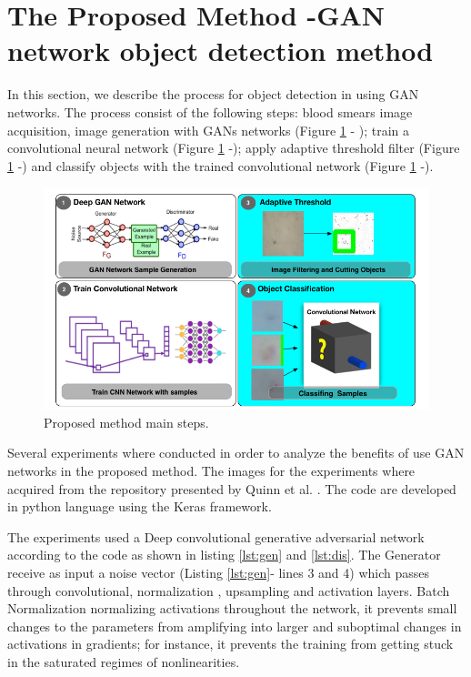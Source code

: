 \section{The Proposed Method -GAN network object detection method}
\label{segmethod}

In this section, we describe the process for object detection in using GAN networks. The process consist of the following steps: blood smears image acquisition, image generation with GANs networks (Figure \ref{fig:maincomp} - ); train a convolutional neural network (Figure \ref{fig:maincomp} -);  apply adaptive  threshold filter (Figure \ref{fig:maincomp} -) and classify objects with the trained convolutional network (Figure \ref{fig:maincomp} -). 

\begin{figure}[h]
\caption{Proposed method main steps.}
\label{fig:maincomp}
  \includegraphics[width=\textwidth]{images/MainComponents.png}
\end{figure}

Several experiments where conducted in order to analyze the benefits of use GAN networks in the proposed method. The images for the experiments where acquired from the repository presented by Quinn et al. \cite{Quinn2016DeepDiagnostics}.  The code are developed in python language using the Keras framework.

The experiments used a Deep convolutional generative adversarial network according to the code as shown in listing \ref{lst:gen} and \ref{lst:dis}. The Generator receive as input a noise vector (Listing \ref{lst:gen}- lines 3 and 4) which passes through convolutional, normalization , upsampling and activation layers. Batch Normalization normalizing activations
throughout the network, it prevents small changes
to the parameters from amplifying into larger and suboptimal
changes in activations in gradients; for instance, it
prevents the training from getting stuck in the saturated
regimes of nonlinearities.

